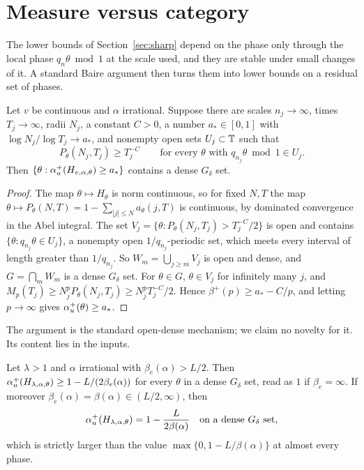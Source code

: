 \section{Measure versus category}\label{sec:category}

The lower bounds of Section~\ref{sec:sharp} depend on the phase only through the local phase $q_n\theta\bmod1$ at the scale used, and they are stable under small changes of it. A standard Baire argument then turns them into lower bounds on a residual set of phases.

\begin{theorem}\label{thm:G}
Let $v$ be continuous and $\alpha$ irrational. Suppose there are scales $n_j\to\infty$, times $T_j\to\infty$, radii $N_j$, a constant $C>0$, a number $a_*\in[0,1]$ with $\log N_j/\log T_j\to a_*$, and nonempty open sets $U_j\subset\mathbb T$ such that
\[
P_\theta(N_j,T_j)\ge T_j^{-C}\qquad\text{for every }\theta\text{ with }q_{n_j}\theta\bmod1\in U_j .
\]
Then $\{\theta:\alpha_u^+(H_{v,\alpha,\theta})\ge a_*\}$ contains a dense $G_\delta$ set.
\end{theorem}

\begin{proof}
The map $\theta\mapsto H_\theta$ is norm continuous, so for fixed $N,T$ the map $\theta\mapsto P_\theta(N,T)=1-\sum_{|j|\le N}a_\theta(j,T)$ is continuous, by dominated convergence in the Abel integral. The set $V_j=\{\theta:P_\theta(N_j,T_j)>T_j^{-C}/2\}$ is open and contains $\{\theta:q_{n_j}\theta\in U_j\}$, a nonempty open $1/q_{n_j}$-periodic set, which meets every interval of length greater than $1/q_{n_j}$. So $W_m=\bigcup_{j\ge m}V_j$ is open and dense, and $G=\bigcap_mW_m$ is a dense $G_\delta$ set. For $\theta\in G$, $\theta\in V_j$ for infinitely many $j$, and $M_p(T_j)\ge N_j^pP_\theta(N_j,T_j)\ge N_j^pT_j^{-C}/2$. Hence $\beta^+(p)\ge a_*-C/p$, and letting $p\to\infty$ gives $\alpha_u^+(\theta)\ge a_*$.
\end{proof}

The argument is the standard open-dense mechanism; we claim no novelty for it. Its content lies in the inputs.

\begin{corollary}\label{cor:G1}
Let $\lambda>1$ and $\alpha$ irrational with $\beta_e(\alpha)>L/2$. Then $\alpha_u^+(H_{\lambda,\alpha,\theta})\ge1-L/(2\beta_e(\alpha))$ for every $\theta$ in a dense $G_\delta$ set, read as $1$ if $\beta_e=\infty$. If moreover $\beta_e(\alpha)=\beta(\alpha)\in(L/2,\infty)$, then
\[
\alpha_u^+(H_{\lambda,\alpha,\theta})=1-\frac L{2\beta(\alpha)}\quad\text{on a dense }G_\delta\text{ set},
\]
which is strictly larger than the value $\max\{0,1-L/\beta(\alpha)\}$ at almost every phase.
\end{corollary}

